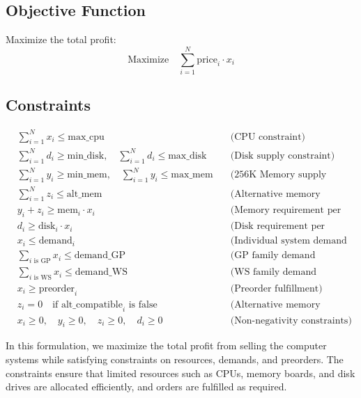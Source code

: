 \documentclass{article}
\begin{document}
\subsection*{Objective Function}
Maximize the total profit:
\[
\text{Maximize} \quad \sum_{i=1}^{N} \text{price}_i \cdot x_i
\]

\subsection*{Constraints}
\begin{align}
    & \sum_{i=1}^{N} x_i \leq \text{max\_cpu} \quad &\text{(CPU constraint)}\\
    & \sum_{i=1}^{N} d_i \geq \text{min\_disk}, \quad \sum_{i=1}^{N} d_i \leq \text{max\_disk} \quad &\text{(Disk supply constraint)}\\
    & \sum_{i=1}^{N} y_i \geq \text{min\_mem}, \quad \sum_{i=1}^{N} y_i \leq \text{max\_mem} \quad &\text{(256K Memory supply constraint)}\\
    & \sum_{i=1}^{N} z_i \leq \text{alt\_mem} \quad &\text{(Alternative memory constraint)}\\
    & y_i + z_i \geq \text{mem}_i \cdot x_i \quad &\text{(Memory requirement per system)}\\
    & d_i \geq \text{disk}_i \cdot x_i \quad &\text{(Disk requirement per system)}\\
    & x_i \leq \text{demand}_i \quad &\text{(Individual system demand constraint)}\\
    & \sum_{i \text{ is GP}} x_i \leq \text{demand\_GP} \quad &\text{(GP family demand constraint)}\\
    & \sum_{i \text{ is WS}} x_i \leq \text{demand\_WS} \quad &\text{(WS family demand constraint)}\\
    & x_i \geq \text{preorder}_i \quad &\text{(Preorder fulfillment)}\\
    & z_i = 0 \quad \text{if } \text{alt\_compatible}_i \text{ is false} \quad &\text{(Alternative memory compatibility)}\\
    & x_i \geq 0, \quad y_i \geq 0, \quad z_i \geq 0, \quad d_i \geq 0 \quad &\text{(Non-negativity constraints)}
\end{align}

In this formulation, we maximize the total profit from selling the computer systems while satisfying constraints on resources, demands, and preorders. The constraints ensure that limited resources such as CPUs, memory boards, and disk drives are allocated efficiently, and orders are fulfilled as required.
\end{document}

